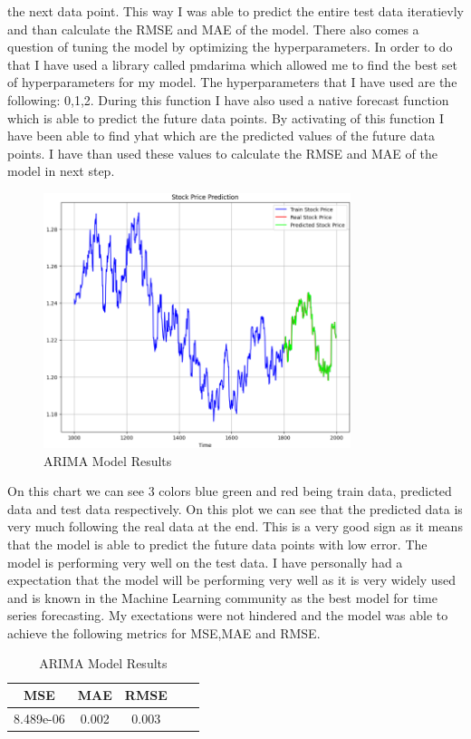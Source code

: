 \documentclass{imc-inf}
\begin{document}
			the next data point. This way I was able to predict the entire test data iteratievly and than calculate the RMSE and MAE of the model. There also comes a question of tuning the
			model by optimizing the hyperparameters. In order to do that I have used a library called pmdarima which allowed me to find the best set of hyperparameters for my model.
			The hyperparameters that I have used are the following: 0,1,2. During this function I have also used a native forecast function which is able to predict the future data points.
			By activating of this function I have been able to find yhat which are the predicted values of the future data points. I have than used these values to calculate the RMSE and MAE
			of the model in next step.
			
			\begin{figure}
				\centering
				\includegraphics[width=0.8\textwidth]{arima_chart.png}
				\caption{ARIMA Model Results}
				\label{fig:arima_model_plots}
			\end{figure}

			On this chart we can see 3 colors blue green and red being train data, predicted data and test data respectively. On this plot we can see that the predicted data is very much following  
			the real data at the end. This is a very good sign as it means that the model is able to predict the future data points with low error. The model is performing very well on the test data. 
			I have personally had a expectation that the model will be performing very well as it is very widely used and is known in the Machine Learning community as the best model for time series forecasting.
			My exectations were not hindered and the model was able to achieve the following metrics for MSE,MAE and RMSE.
			\begin{table}[h!]
				\centering
				\begin{tabular}{|c|c|c|c|c|}
					\hline
					\textbf{MSE} & \textbf{MAE} & \textbf{RMSE} \\ \hline
					8.489e-06 & 0.002 & 0.003 \\ \hline
				\end{tabular}
				\caption{ARIMA Model Results}
				\label{tab:arima_model_results}
			\end{table}
\end{document}
